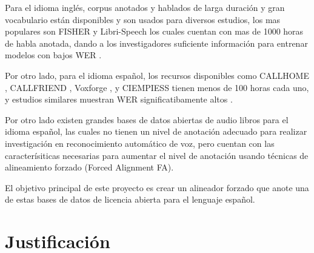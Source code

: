 Para el idioma inglés, corpus anotados y hablados de larga duración y gran vocabulario están disponibles y son usados para diversos estudios, los mas populares son FISHER \cite{CieriTheSpeech-to-Text} y Libri-Speech  \cite{PanayotovLIBRISPEECH:BOOKS}  los cuales cuentan con mas de 1000 horas de habla anotada, dando a los investigadores suficiente información para entrenar modelos con bajos WER \cite{HannunDeepRecognition}.

Por otro lado, para el idioma español, los recursos disponibles como CALLHOME \cite{CALLHOMESpa}, CALLFRIEND  \cite{CALLFRIENDSpa}, Voxforge \cite{Voxforge.org}, y CIEMPIESS \cite{Hernandez-MenaCIEMPIESS:Corpus} tienen menos de 100 horas cada uno, y estudios similares muestran WER significatibamente altos \cite{Hernandez-Mena2017AutomaticResources}.

Por otro lado existen grandes bases de datos abiertas de audio libros para el idioma español, las cuales no tienen un nivel de anotación adecuado para realizar investigación en reconocimiento automático de voz, pero cuentan con las caracterísiticas necesarias para aumentar el nivel de anotación usando técnicas de alineamiento forzado (Forced Alignment FA). 

El objetivo principal de este proyecto es crear un alineador forzado que anote una de estas bases de datos de licencia abierta para el lenguaje español.

\section{Justificación}


